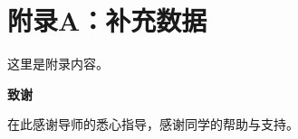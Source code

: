 \documentclass[12pt,a4paper,openany]{ctexart}
\begin{document}
\newpage
\tableofcontents
\newpage
\listoffigures
\newpage
\listoftables







\newpage



\newpage
\appendix
\chapter{附录A：补充数据}
这里是附录内容。

\newpage
\begin{center}
{\Large\bfseries 致\quad 谢}
\end{center}
\vspace{1em}

在此感谢导师的悉心指导，感谢同学的帮助与支持。
\end{document}
